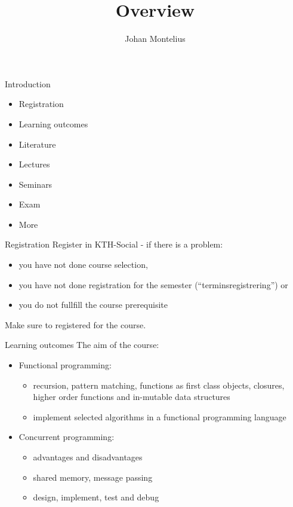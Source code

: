 

\title[ID1019 Overview]{Overview}


\author{Johan Montelius}
\date{\semester}



\begin{frame}
\titlepage
\end{frame}


\begin{frame}{Introduction}
  \begin{itemize}
    \pause \item Registration
    \pause \item Learning outcomes
    \pause \item Literature
    \pause \item Lectures
    \pause \item Seminars
    \pause \item Exam
    \pause \item More
  \end{itemize}
\end{frame}

\begin{frame}{Registration}
  Register in KTH-Social - if there is a problem:
\pause
  \begin{itemize}
    \item you have not done course selection,
    \item you have not done registration for the semester (``terminsregistrering'') or
    \item you do not fullfill the course prerequisite
  \end{itemize}
\pause
  Make sure to registered for the course.
\end{frame}

\begin{frame}{Learning outcomes}
  The aim of the course:

\pause
\begin{itemize}
\item Functional programming:
\pause
  \begin{itemize}
   \item recursion, pattern matching, functions as first class objects, closures, higher order functions and in-mutable data structures
\pause
   \item implement selected algorithms in a functional programming language
  \end{itemize}
\pause
\item Concurrent programming:
  \begin{itemize}
\pause
    \item advantages and disadvantages
\pause
    \item shared memory, message passing
\pause
    \item design, implement, test and debug 
  \end{itemize}  
\end{itemize}

\end{frame}


